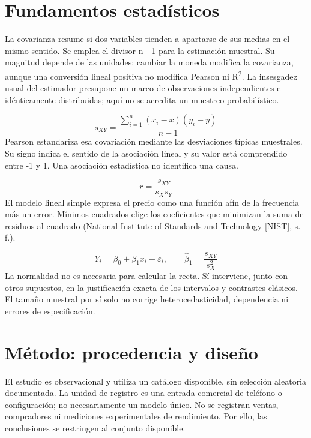 \documentclass[12pt,letterpaper]{article}
\begin{document}
\clearpage
\section*{Fundamentos estadísticos}
La covarianza resume si dos variables tienden a apartarse de sus medias en el mismo sentido. Se emplea el divisor n - 1 para la estimación muestral. Su magnitud depende de las unidades: cambiar la moneda modifica la covarianza, aunque una conversión lineal positiva no modifica Pearson ni R\textsuperscript{2}. La insesgadez usual del estimador presupone un marco de observaciones independientes e idénticamente distribuidas; aquí no se acredita un muestreo probabilístico.

\begin{equation*}s_{XY}=\frac{\sum_{i=1}^{n}(x_i-\bar{x})(y_i-\bar{y})}{n-1}\end{equation*}
Pearson estandariza esa covariación mediante las desviaciones típicas muestrales. Su signo indica el sentido de la asociación lineal y su valor está comprendido entre -1 y 1. Una asociación estadística no identifica una causa.

\begin{equation*}r=\frac{s_{XY}}{s_Xs_Y}\end{equation*}
El modelo lineal simple expresa el precio como una función afín de la frecuencia más un error. Mínimos cuadrados elige los coeficientes que minimizan la suma de residuos al cuadrado (National Institute of Standards and Technology [NIST], s. f.).

\begin{equation*}Y_i=\beta_0+\beta_1x_i+\varepsilon_i,\qquad \widehat{\beta}_1=\frac{s_{XY}}{s_X^2}\end{equation*}
La normalidad no es necesaria para calcular la recta. Sí interviene, junto con otros supuestos, en la justificación exacta de los intervalos y contrastes clásicos. El tamaño muestral por sí solo no corrige heterocedasticidad, dependencia ni errores de especificación.

\clearpage
\section*{Método: procedencia y diseño}
El estudio es observacional y utiliza un catálogo disponible, sin selección aleatoria documentada. La unidad de registro es una entrada comercial de teléfono o configuración; no necesariamente un modelo único. No se registran ventas, compradores ni mediciones experimentales de rendimiento. Por ello, las conclusiones se restringen al conjunto disponible.
\end{document}
